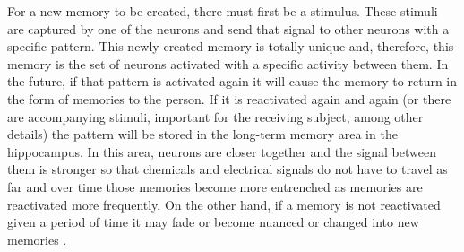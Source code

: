 \begin{itemize}
For a new memory to be created, there must first be a stimulus. These stimuli are captured by one of the neurons and send that signal to other neurons with a specific pattern. This newly created memory is totally unique and, therefore, this memory is the set of neurons activated with a specific activity between them. In the future, if that pattern is activated again it will cause the memory to return in the form of memories to the person. If it is reactivated again and again (or there are accompanying stimuli, important for the receiving subject, among other details) the pattern will be stored in the long-term memory area in the hippocampus. In this area, neurons are closer together and the signal between them is stronger so that chemicals and electrical signals do not have to travel as far and over time those memories become more entrenched as memories are reactivated more frequently. On the other hand, if a memory is not reactivated given a period of time it may fade or become nuanced or changed into new memories \cite{brainmemory}.

\end{itemize}